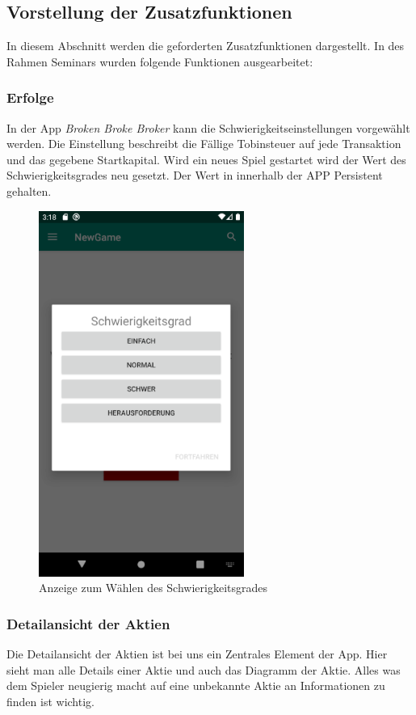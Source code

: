 \documentclass[10pt]{scrartcl}
\begin{document}
\subsection{Vorstellung der Zusatzfunktionen}
In diesem Abschnitt werden die geforderten Zusatzfunktionen dargestellt. In des Rahmen Seminars wurden folgende Funktionen ausgearbeitet:
	
	
	\subsubsection{Erfolge}
	In der App \textit{Broken Broke Broker} kann die Schwierigkeitseinstellungen vorgewählt werden. Die Einstellung beschreibt die Fällige Tobinsteuer auf jede Transaktion und das gegebene Startkapital. Wird ein neues Spiel gestartet wird der Wert des Schwierigkeitsgrades neu gesetzt. Der Wert in innerhalb der APP Persistent gehalten.
	\begin{figure}[H]
		\centering
		\includegraphics[width=0.6\textwidth]{Bilder/Prsi/diff.png}
		\caption{Anzeige zum Wählen des Schwierigkeitsgrades}
	\end{figure}
	 
	\subsubsection{Detailansicht der Aktien}
	Die Detailansicht der Aktien ist bei uns ein Zentrales Element der App. Hier sieht man alle Details einer Aktie und auch das Diagramm der Aktie. Alles was dem Spieler neugierig macht auf eine unbekannte Aktie an Informationen zu finden ist wichtig.
	
\end{document}
